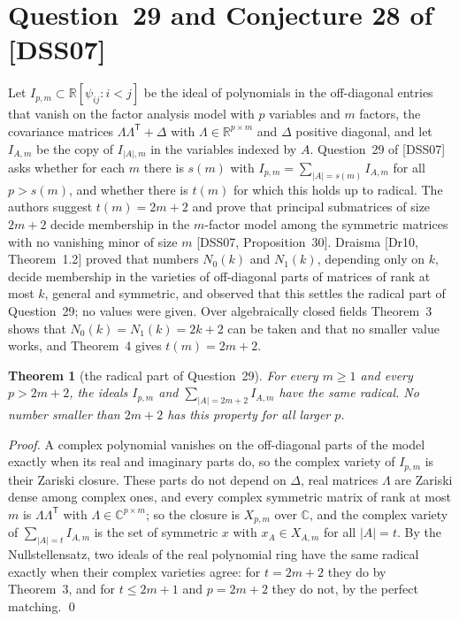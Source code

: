 \documentclass[11pt,letterpaper,reqno]{amsart}
\theoremstyle{spaced}
\newtheorem{theorem}{Theorem}
\begin{document}
\hypertarget{question-29-and-conjecture-28-of-dss07}{%
\section{Question~29 and Conjecture 28 of {[}DSS07{]}}\label{question-29-and-conjecture-28-of-dss07}}

Let \(I_{p,m} \subset \mathbb{R}[\psi_{ij} : i < j]\) be the ideal of polynomials in the off-diagonal entries that vanish on the factor analysis model with \(p\) variables and \(m\) factors, the covariance matrices \(\Lambda\Lambda^{\mathsf T} + \Delta\) with \(\Lambda \in \mathbb{R}^{p \times m}\) and \(\Delta\) positive diagonal, and let \(I_{A,m}\) be the copy of \(I_{\lvert A\rvert, m}\) in the variables indexed by \(A\). Question~29 of {[}DSS07{]} asks whether for each \(m\) there is \(s(m)\) with \(I_{p,m} = \sum_{\lvert A\rvert = s(m)} I_{A,m}\) for all \(p > s(m)\), and whether there is \(t(m)\) for which this holds up to radical. The authors suggest \(t(m) = 2m+2\) and prove that principal submatrices of size \(2m+2\) decide membership in the \(m\)-factor model among the symmetric matrices with no vanishing minor of size \(m\) {[}DSS07, Proposition~30{]}. Draisma {[}Dr10, Theorem~1.2{]} proved that numbers \(N_0(k)\) and \(N_1(k)\), depending only on \(k\), decide membership in the varieties of off-diagonal parts of matrices of rank at most \(k\), general and symmetric, and observed that this settles the radical part of Question~29; no values were given. Over algebraically closed fields Theorem~3 shows that \(N_0(k) = N_1(k) = 2k+2\) can be taken and that no smaller value works, and Theorem~4 gives \(t(m) = 2m+2\).

\begin{theorem}[the radical part of Question~29]
For every \(m \ge 1\) and every \(p > 2m+2\), the ideals \(I_{p,m}\) and \(\sum_{\lvert A\rvert = 2m+2} I_{A,m}\) have the same radical. No number smaller than \(2m+2\) has this property for all larger \(p\).
\end{theorem}

\emph{Proof.} A complex polynomial vanishes on the off-diagonal parts of the model exactly when its real and imaginary parts do, so the complex variety of \(I_{p,m}\) is their Zariski closure. These parts do not depend on \(\Delta\), real matrices \(\Lambda\) are Zariski dense among complex ones, and every complex symmetric matrix of rank at most \(m\) is \(\Lambda\Lambda^{\mathsf T}\) with \(\Lambda \in \mathbb{C}^{p \times m}\); so the closure is \(X_{p,m}\) over \(\mathbb{C}\), and the complex variety of \(\sum_{\lvert A\rvert = t} I_{A,m}\) is the set of symmetric \(x\) with \(x_A \in X_{A,m}\) for all \(\lvert A\rvert = t\). By the Nullstellensatz, two ideals of the real polynomial ring have the same radical exactly when their complex varieties agree: for \(t = 2m+2\) they do by Theorem~3, and for \(t \le 2m+1\) and \(p = 2m+2\) they do not, by the perfect matching. \qed
\end{document}
